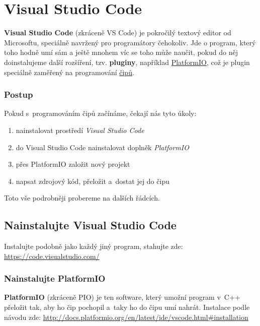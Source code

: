  \section{Visual Studio Code} \label{vscode} 
 
 \textbf{Visual Studio Code} (zkráceně VS Code) je pokročilý textový editor od Microsoftu, speciálně navržený pro programátory čehokoliv.
 Jde o program, který toho hodně umí sám a ještě mnohem víc se toho může naučit, pokud do něj doinstalujeme další rozšíření, 
 tzv. \textbf{pluginy}, 
 například  \hyperref[platformio]{PlatformIO}, což je plugin speciálně zaměřený na programování \hyperref[cip]{čipů}. 
 
 \subsubsection*{Postup}
 
 Pokud s~programováním čipů začínáme, čekají nás tyto úkoly:
 \begin{enumerate}
 	\item  nainstalovat prostředí {\it Visual Studio Code}
 	\item  do Visual Studio Code nainstalovat doplněk {\it PlatformIO }
 	\item  přes PlatformIO založit nový projekt
 	\item  napsat zdrojový kód, přeložit a~dostat jej do čipu 
 \end{enumerate}
 Toto vše podrobněji probereme na dalších řádcích. 
 
 \label{vsc} \subsection{Nainstalujte  Visual Studio Code} 
 
 Instalujte podobně jako každý jiný program, stahujte zde: \url{https://code.visualstudio.com/}  
 
 
 \subsubsection{Nainstalujte PlatformIO} \label{platformio}
 
  \textbf{PlatformIO} (zkráceně PIO) je ten software, který umožní program v~C++ 
 přeložit tak, aby ho čip pochopil a~taky ho do čipu umí nahrát. 
 Instalace podle návodu zde: \url{http://docs.platformio.org/en/latest/ide/vscode.html\#installation}
 

